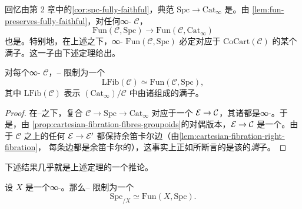 回忆由第 2 章中的\cref{cor:spc-fully-faithful}，典范\trFunctor{}%
$\mathrm{Spc} \to \mathrm{Cat}_\infty$ 是\trFullyFaithful{}。由%
\cref{lem:fun-preserves-fully-faithful}，对任何∞-\trCategory{} $\mathcal{C}$，
\trFunctor{}%
\[
\mathrm{Fun}(\mathcal{C}, \mathrm{Spc}) \to \mathrm{Fun}(\mathcal{C}, \mathrm{Cat}_\infty)
\]
也是\trFullyFaithful{}。特别地，在上述\trEquivalence{}之下，∞-\trCategory{}%
$\mathrm{Fun}(\mathcal{C}, \mathrm{Spc})$ 必定对应于 $\mathrm{CoCart}(\mathcal{C})$
的某个满子\trCategory{}。这一子\trCategory{}由下述定理给出。

\begin{theorem}\label{thm:lfib-straightening}
对每个∞-\trCategory{} $\mathcal{C}$，\trStraightening{}--\trUnstraightening{}%
\trEquivalence{}限制为一个\trEquivalence{}%
\[
\mathrm{LFib}(\mathcal{C}) \simeq \mathrm{Fun}(\mathcal{C}, \mathrm{Spc}),
\]
其中 $\mathrm{LFib}(\mathcal{C})$ 表示\trSlice{} $(\mathrm{Cat}_\infty)/\mathcal{C}$
中由诸\trLeftFibration{}组成的满子\trCategory{}。
\end{theorem}

\begin{proof}
在\trStraightening{}--\trUnstraightening{}\trEquivalence{}之下，复合
$\mathcal{C} \to \mathrm{Spc} \to \mathrm{Cat}_\infty$ 对应于一个\trCocartesianFibration{}%
$\mathcal{E} \to \mathcal{C}$，其诸\trFibre{}都是∞-\trGroupoid{}。于是，由%
\cref{prop:cartesian-fibration-fibres-groupoids}的对偶版本，$\mathcal{E} \to \mathcal{C}$
是一个\trLeftFibration{}。由于 $\mathcal{C}$ 之上的任何\trMorphism{}%
$\mathcal{E} \to \mathcal{E}'$ 都保持余笛卡尔边（由\cref{lem:cartesian-fibration-right-fibration}，
每条边都是余笛卡尔的），这事实上正如所断言的是该\trSliceCategory{}的\emph{满}子\trCategory{}。
\end{proof}

下述结果几乎就是上述定理的一个推论。

\begin{theorem}\label{thm:spc-slice-straightening}
设 $X$ 是一个∞-\trGroupoid{}。那么\trStraightening{}--\trUnstraightening{}%
\trEquivalence{}限制为一个\trEquivalence{}%
\[
\mathrm{Spc}_{/X} \simeq \mathrm{Fun}(X, \mathrm{Spc}).
\]
\end{theorem}

